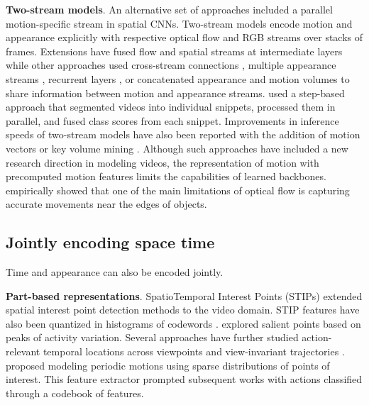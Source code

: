 \noindent
\textbf{Two-stream models}. An alternative set of approaches included a parallel motion-specific stream in spatial CNNs. Two-stream models \citep{simonyan2014two} encode motion and appearance explicitly with respective optical flow and RGB streams over stacks of frames. Extensions \citep{feichtenhofer2016convolutional} have fused flow and spatial streams at intermediate layers while other approaches used cross-stream connections \citep{feichtenhofer2017spatiotemporal}, multiple appearance streams \citep{tu2018multistream}, recurrent layers \citep{singh2016multi}, or concatenated appearance and motion volumes \citep{jain2015modeep,wang2017spatiotemporal} to share information between motion and appearance streams. \citet{wang2016temporal} used a step-based approach that segmented videos into individual snippets, processed them in parallel, and fused class scores from each snippet. Improvements in inference speeds of two-stream models have also been reported with the addition of motion vectors \citep{zhang2016real} or key volume mining \citep{zhu2016key}. Although such approaches have included a new research direction in modeling videos, the representation of motion with precomputed motion features limits the capabilities of learned backbones. \citet{sevilla2019integration} empirically showed that one of the main limitations of optical flow is capturing accurate movements near the edges of objects.

\subsection{Jointly encoding space time}
\label{sec:modeling::joint}

 Time and appearance can also be encoded jointly. 

\noindent
\textbf{Part-based representations}. SpatioTemporal Interest Points (STIPs) \citep{laptev2003space} extended spatial interest point detection methods \citep{forstner1987fast,harris1988combined} to the video domain. STIP features have also been quantized in histograms of codewords \citep{schuldt2004recognizing}. \citet {liu2008learning,oikonomopoulos2005spatiotemporal} explored salient points based on peaks of activity variation. Several approaches have further studied action-relevant temporal locations across viewpoints \citep{yilmaz2006matching} and view-invariant trajectories \citep{sheikh2005exploring}. \citet{dollar2005behavior} proposed modeling periodic motions using sparse distributions of points of interest. This feature extractor prompted subsequent works \citep{niebles2008unsupervised} with actions classified through a codebook of features.

